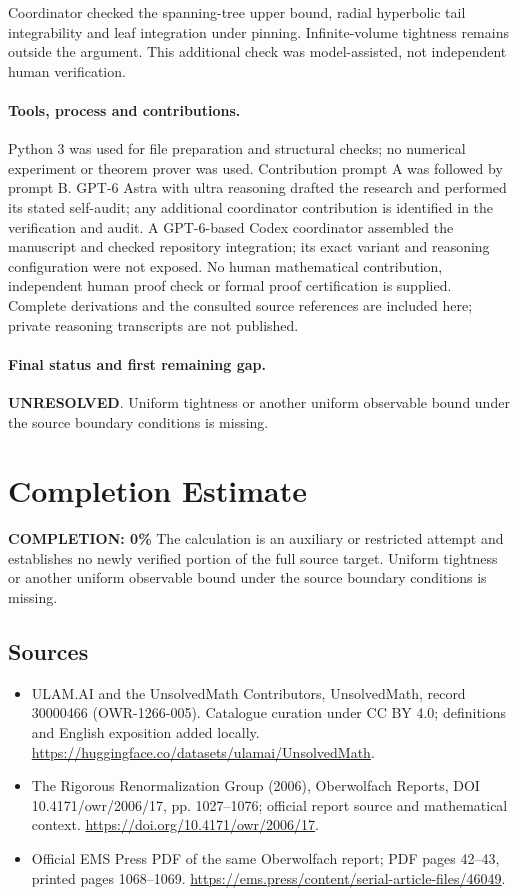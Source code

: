 \documentclass[11pt]{article}
\begin{document}
Coordinator checked the spanning-tree upper bound, radial hyperbolic tail integrability and leaf integration under pinning. Infinite-volume tightness remains outside the argument. This additional check was model-assisted, not independent human verification.

\paragraph{Tools, process and contributions.}
Python 3 was used for file preparation and structural checks; no numerical experiment or theorem prover was used. Contribution prompt A was followed by prompt B. GPT-6 Astra with ultra reasoning drafted the research and performed its stated self-audit; any additional coordinator contribution is identified in the verification and audit. A GPT-6-based Codex coordinator assembled the manuscript and checked repository integration; its exact variant and reasoning configuration were not exposed. No human mathematical contribution, independent human proof check or formal proof certification is supplied. Complete derivations and the consulted source references are included here; private reasoning transcripts are not published.

\paragraph{Final status and first remaining gap.}
\textbf{UNRESOLVED}. Uniform tightness or another uniform observable bound under the source boundary conditions is missing.

\section{Completion Estimate}
\noindent\textbf{COMPLETION: 0\%}
The calculation is an auxiliary or restricted attempt and establishes no newly verified portion of the full source target. Uniform tightness or another uniform observable bound under the source boundary conditions is missing.

\subsection{Sources}
\begin{itemize}
\item[\hypertarget{source:30000466:1}{S1}] ULAM.AI and the UnsolvedMath Contributors, UnsolvedMath, record 30000466 (OWR-1266-005). Catalogue curation under CC BY 4.0; definitions and English exposition added locally.
\url{https://huggingface.co/datasets/ulamai/UnsolvedMath}.
\item[\hypertarget{source:30000466:2}{S2}] The Rigorous Renormalization Group (2006), Oberwolfach Reports, DOI 10.4171/owr/2006/17, pp. 1027--1076; official report source and mathematical context.
\url{https://doi.org/10.4171/owr/2006/17}.
\item[\hypertarget{source:30000466:3}{S3}] Official EMS Press PDF of the same Oberwolfach report; PDF pages 42--43, printed pages 1068--1069.
\url{https://ems.press/content/serial-article-files/46049}.
\end{itemize}
\label{end:30000466}
\end{document}
